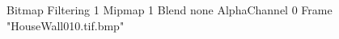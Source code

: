 {Bitmap
	{Filtering 1}
	{Mipmap 1}
	{Blend none}
	{AlphaChannel 0}
	{Frame "HouseWall010.tif.bmp"}
}
